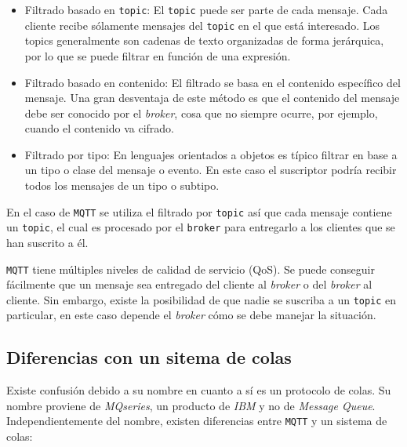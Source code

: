 \begin{itemize}\itemsep1pt \parskip0pt 
\item Filtrado basado en \texttt{topic}: El \texttt{topic} puede ser parte de cada mensaje. Cada
cliente recibe sólamente mensajes del \texttt{topic} en el que está interesado. Los topics
generalmente son cadenas de texto organizadas de forma jerárquica, por lo que se puede
filtrar en función de una expresión.
\item Filtrado basado en contenido: El filtrado se basa en el contenido específico
del mensaje. Una gran desventaja de este método es que el contenido del mensaje
debe ser conocido por el \emph{broker}, cosa que no siempre ocurre, por ejemplo,
cuando el contenido va cifrado.
\item Filtrado por tipo: En lenguajes orientados a objetos es típico filtrar en
base a un tipo o clase del mensaje o evento. En este caso el suscriptor podría
recibir todos los mensajes de un tipo o subtipo.
\end{itemize}

En el caso de \texttt{MQTT} se utiliza el filtrado por \texttt{topic} así que cada
mensaje contiene un \texttt{topic}, el cual es procesado por el \texttt{broker}
para entregarlo a los clientes que se han suscrito a él.

\texttt{MQTT} tiene múltiples niveles de calidad de servicio (QoS). Se puede
conseguir fácilmente que un mensaje sea entregado del cliente al \emph{broker} o
del \emph{broker} al cliente. Sin embargo, existe la posibilidad de que nadie
se suscriba a un \texttt{topic} en particular, en este caso depende el \emph{broker}
cómo se debe manejar la situación.

\subsection{Diferencias con un sitema de colas}

Existe confusión debido a su nombre en cuanto a sí es un protocolo de colas.
Su nombre proviene de \emph{MQseries}, un producto de \emph{IBM} y no de \emph{Message Queue}.
Independientemente del nombre, existen diferencias entre \texttt{MQTT} y un
sistema de colas:

